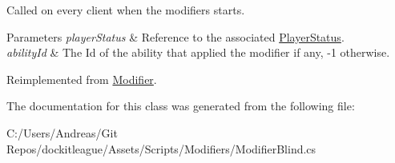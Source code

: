Called on every client when the modifiers starts. 


\begin{DoxyParams}{Parameters}
{\em player\+Status} & Reference to the associated \hyperlink{class_player_status}{Player\+Status}.\\
\hline
{\em ability\+Id} & The Id of the ability that applied the modifier if any, -\/1 otherwise.\\
\hline
\end{DoxyParams}


Reimplemented from \hyperlink{class_modifier_a90f173bd4674843a683769f46520273b}{Modifier}.



The documentation for this class was generated from the following file\+:\begin{DoxyCompactItemize}
\item 
C\+:/\+Users/\+Andreas/\+Git Repos/dockitleague/\+Assets/\+Scripts/\+Modifiers/Modifier\+Blind.\+cs\end{DoxyCompactItemize}
